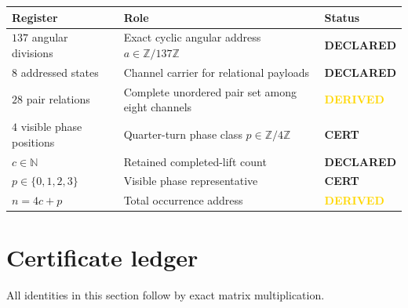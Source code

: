 \documentclass[11pt,letterpaper]{article}
\theoremstyle{clearonyx}
\newcommand{\Z}{\mathbb{Z}}
\newcommand{\N}{\mathbb{N}}
\newcommand{\statuscert}{\textcolor{certgreen}{\textbf{CERT}}}
\newcommand{\statusderived}{\textcolor{gold}{\textbf{DERIVED}}}
\newcommand{\statusdeclared}{\textcolor{declareblue}{\textbf{DECLARED}}}
\begin{document}
\begin{center}
\begin{tabularx}{0.92\textwidth}{@{}>{\raggedright\arraybackslash}p{}X>{\raggedright\arraybackslash}p{}@{}}
\toprule
\textbf{Register} & \textbf{Role} & \textbf{Status}\\
\midrule
$137$ angular divisions & Exact cyclic angular address $a\in\Z/137\Z$ & \statusdeclared\\
$8$ addressed states & Channel carrier for relational payloads & \statusdeclared\\
$28$ pair relations & Complete unordered pair set among eight channels & \statusderived\\
$4$ visible phase positions & Quarter-turn phase class $p\in\Z/4\Z$ & \statuscert\\
$c\in\N$ & Retained completed-lift count & \statusdeclared\\
$p\in\{0,1,2,3\}$ & Visible phase representative & \statuscert\\
$n=4c+p$ & Total occurrence address & \statusderived\\
\bottomrule
\end{tabularx}
\end{center}

\section{Certificate ledger}

All identities in this section follow by exact matrix multiplication.
\end{document}

